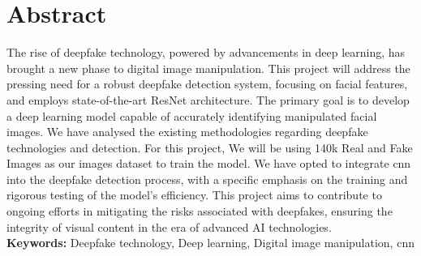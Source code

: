 \chapter*{Abstract}
The rise of deepfake technology, powered by advancements in deep learning, has brought a new phase to digital image manipulation. This project will address the pressing need for a robust deepfake detection system, focusing on facial features, and employs state-of-the-art ResNet architecture. The primary goal is to develop a deep learning model capable of accurately identifying manipulated facial images. We have analysed the existing methodologies regarding deepfake technologies and detection. For this project, We will be using 140k Real and Fake Images as our images dataset to  train the model. We have opted to integrate \acrshort{cnn} into the deepfake detection process, with a specific emphasis on the training and rigorous testing of the model's efficiency. This project aims to contribute to ongoing efforts in mitigating the risks associated with deepfakes, ensuring the integrity of visual content in the era of advanced AI technologies.\\


\textbf{Keywords: }Deepfake technology, Deep learning, Digital image manipulation, \acrshort{cnn}


